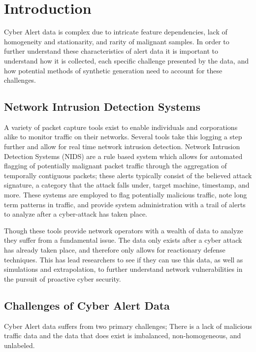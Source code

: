 \chapter{Introduction}

Cyber Alert data is complex due to intricate feature dependencies, lack of homogeneity and stationarity, and rarity of malignant samples. In order to further understand these characteristics of alert data it is important to understand how it is collected, each specific challenge presented by the data, and how potential methods of synthetic generation need to account for these challenges. 

\section{Network Intrusion Detection Systems}
A variety of packet capture tools exist to enable individuals and corporations alike to monitor traffic on their networks. Several tools take this logging a step further and allow for real time network intrusion detection. Network Intrusion Detection Systems (NIDS) are a rule based system which allows for automated flagging of potentially malignant packet traffic through the aggregation of temporally contiguous packets;  these alerts typically consist of the believed attack signature, a category that the attack falls under, target machine, timestamp, and more. These systems are employed to flag potentially malicious traffic, note long term patterns in traffic, and provide system administration with a trail of alerts to analyze after a cyber-attack has taken place. 

Though these tools provide network operators with a wealth of data to analyze they suffer from a fundamental issue. The data only exists after a cyber attack has already taken place, and therefore only allows for reactionary defense techniques. This has lead researchers to see if they can use this data, as well as simulations and extrapolation, to further understand network vulnerabilities in the pursuit of proactive cyber security. 

\section{Challenges of Cyber Alert Data}
Cyber Alert data suffers from two primary challenges; There is a lack of malicious traffic data and the data that does exist is imbalanced, non-homogeneous, and unlabeled. 

